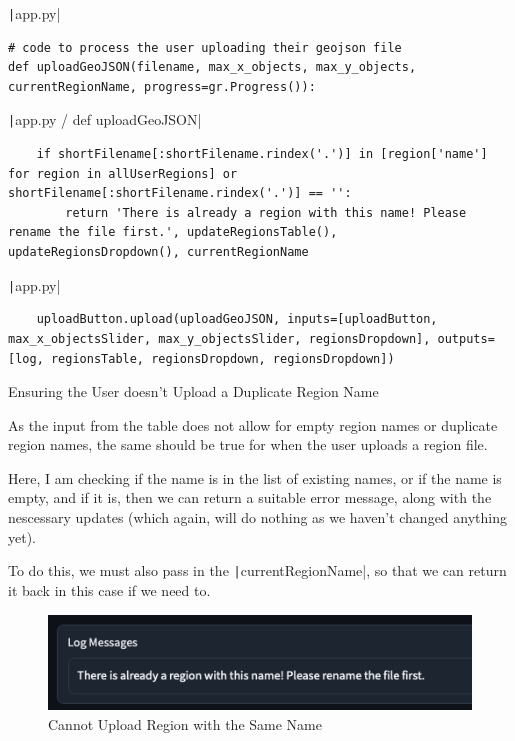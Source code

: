 \documentclass[12pt]{report}
\newcommand{\pil}[1]{\protect\texttt|#1|}
\begin{document}
\begin{listing}[H]
\pil{app.py}
\begin{verbatim}
# code to process the user uploading their geojson file
def uploadGeoJSON(filename, max_x_objects, max_y_objects, currentRegionName, progress=gr.Progress()):
\end{verbatim}
\pil{app.py / def uploadGeoJSON}
\begin{verbatim}
    if shortFilename[:shortFilename.rindex('.')] in [region['name'] for region in allUserRegions] or shortFilename[:shortFilename.rindex('.')] == '':
        return 'There is already a region with this name! Please rename the file first.', updateRegionsTable(), updateRegionsDropdown(), currentRegionName
\end{verbatim}
\pil{app.py}
\begin{verbatim}
    uploadButton.upload(uploadGeoJSON, inputs=[uploadButton, max_x_objectsSlider, max_y_objectsSlider, regionsDropdown], outputs=[log, regionsTable, regionsDropdown, regionsDropdown])
\end{verbatim}
\caption{Ensuring the User doesn't Upload a Duplicate Region Name}\label{cs:uploadExistingName}
\end{listing}

As the input from the table does not allow for empty region names or duplicate region names, the same should be true for when the user uploads a region file.

Here, I am checking if the name is in the list of existing names, or if the name is empty, and if it is, then we can return a suitable error message, along with the nescessary updates (which again, will do nothing as we haven't changed anything yet).

To do this, we must also pass in the \pil{currentRegionName}, so that we can return it back in this case if we need to.

\begin{figure}[H]
\centering
\includegraphics[width=14cm]{ss20.10.png}
\caption{Cannot Upload Region with the Same Name}\label{fig:ss20.10}
\end{figure}
\end{document}
